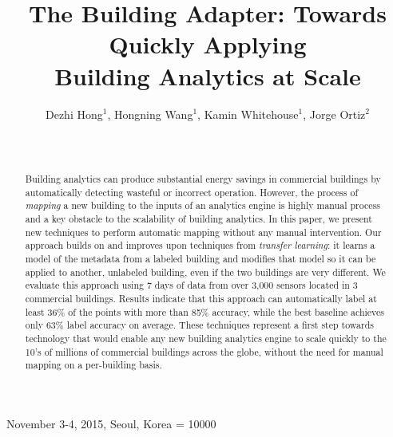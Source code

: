 \documentclass{acm_proc_article-sp}
\begin{document}
 {November 3-4, 2015, Seoul, Korea} 
\widowpenalty = 10000

\title{The Building Adapter: Towards Quickly Applying\\ Building Analytics at Scale}

\author{
\alignauthor
Dezhi Hong$^1$,  Hongning Wang$^1$,  Kamin Whitehouse$^1$, Jorge Ortiz$^2$\\
	\\
	\\
}

\maketitle
\begin{abstract}
Building analytics can produce substantial energy savings in commercial
buildings by automatically detecting wasteful or incorrect operation.  However,
the process of {\em mapping} a new building to the inputs of an analytics engine
is highly manual process and a key obstacle to the scalability of building
analytics. In this paper, we present new techniques to perform automatic
mapping without any manual intervention. Our approach builds on and improves
upon techniques from {\em transfer learning}: it learns a model of the metadata
from a labeled building and modifies that model so it can be applied to another,
unlabeled building, even if the two buildings are very different. We evaluate
this approach using 7 days of data from over 3,000 sensors located in 3
commercial buildings. Results indicate that this approach can automatically
label at least 36\% of the points with more than 85\% accuracy, while the
best baseline achieves only 63\% label accuracy on average. These techniques
represent a first step towards technology that would enable any new building
analytics engine to scale quickly to the 10's of millions of commercial
buildings across the globe, without the need for manual mapping on a
per-building basis.
\end{abstract}

\end{document}
